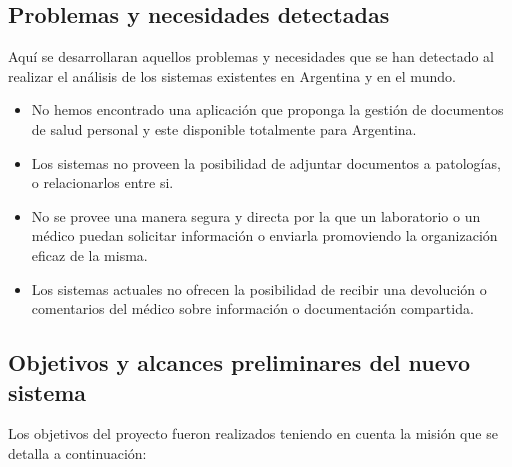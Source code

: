 \subsection{Problemas y necesidades detectadas}
Aquí se desarrollaran aquellos problemas y necesidades que se han detectado al realizar el análisis de los sistemas existentes en Argentina y en el mundo.
	\begin{itemize}

     \item No hemos encontrado una aplicación que proponga la gestión de documentos de salud personal y este disponible totalmente para Argentina.
     
     \item Los sistemas no proveen la posibilidad de adjuntar documentos a patologías, o relacionarlos entre si.
     
     \item No se provee una manera segura y directa por la que un laboratorio o un médico puedan solicitar información o enviarla promoviendo la organización eficaz de la misma. 
     
     \item Los sistemas actuales no ofrecen la posibilidad de recibir una devolución o comentarios del médico sobre información o documentación compartida.


     


\end{itemize}

\clearpage
\subsection{Objetivos y alcances preliminares del nuevo sistema}

Los objetivos del proyecto fueron realizados teniendo en cuenta la misión que se detalla a continuación:

